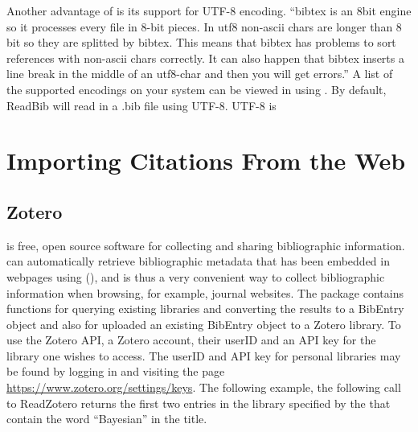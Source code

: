 \documentclass[article]{jss}\usepackage[]{graphicx}\usepackage[]{color}
\newcommand{\ourpkg}{\pkg{RefManageR}}
\begin{document}
Another advantage of \Biblatex{} is its support for UTF-8 encoding. ``bibtex is an 8bit engine so it processes every file in 8-bit pieces. In utf8 non-ascii chars are longer than 8 bit so they are splitted by bibtex. This means that bibtex has problems to sort references with non-ascii chars correctly. It can also happen that bibtex inserts a line break in the middle of an utf8-char and then you will get errors.''  A list of the supported encodings on your system can be viewed in  using .  By default, ReadBib will read in a .bib file using UTF-8.  UTF-8 is  

\section{Importing Citations From the Web}
\subsection{Zotero}
 is free, open source software for collecting and sharing bibliographic information.   can automatically retrieve bibliographic metadata that has been embedded in webpages using  (), and is thus a very convenient way to collect bibliographic information when browsing, for example, journal websites.  The \ourpkg{} package contains functions for querying existing  libraries and converting the results to a BibEntry object and also for uploaded an existing BibEntry object to a Zotero library.  To use the Zotero API, a Zotero account, their userID and an API key for the library one wishes to access.  The userID and API key for personal libraries may be found by logging in and visiting the page \url{https://www.zotero.org/settings/keys}.  The following example, the following call to ReadZotero returns the first two entries in the library specified by the  that contain the word ``Bayesian'' in the title.
\end{document}
